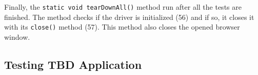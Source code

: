 Finally, the \lstinline!static void tearDownAll()! method run after all the tests are finished. The method checks if the driver is initialized (56) and if so, it closes it with its \lstinline!close()! method (57). This method also closes the opened browser window.

\subsection{Testing TBD Application}
